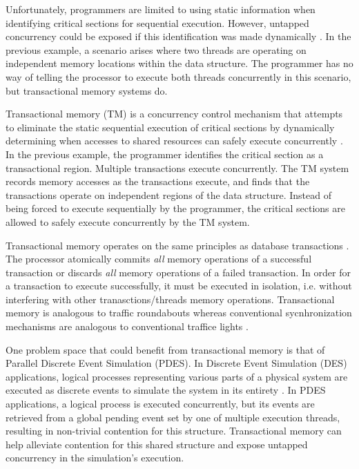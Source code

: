 \documentclass[a4paper]{article}
\begin{document}

\indent Unfortunately, programmers are limited to using static information when
identifying critical sections for sequential execution.  However, untapped
concurrency could be exposed if this identification was made dynamically
\cite{intel_prog_ref}.  In the previous example, a scenario arises where two threads are operating on
independent memory locations within the data structure.  The programmer has no
way of telling the processor to execute both threads concurrently in this
scenario, but transactional memory systems do. \par

\indent Transactional memory (TM) is a concurrency control mechanism that
attempts to eliminate the static sequential execution of critical sections by
dynamically determining when accesses to shared resources can safely execute
concurrently \cite{sle_rajwar}.  In the previous example, the programmer
identifies the critical section as a transactional region. Multiple transactions
execute concurrently.  The TM system records memory accesses as the transactions
execute, and finds that the transactions operate on independent regions of the
data structure.  Instead of being forced to execute sequentially by the
programmer, the critical sections are allowed to safely execute concurrently by
the TM system.\par 

\indent Transactional memory operates on the same principles as database
transactions \cite{tm_2nd}.  The processor atomically commits \textit{all}
memory operations of a successful transaction or discards \textit{all} memory
operations of a failed transaction.  In order for a transaction to execute
successfully, it must be executed in isolation, i.e. without interfering with
other tranasctions/threads memory operations. Transactional memory is analogous
to traffic roundabouts whereas conventional sycnhronization mechanisms are
analogous to conventional traffice lights \cite{neuling_vid}. \par

\indent One problem space that could benefit from transactional memory is that of
Parallel Discrete Event Simulation (PDES).  In Discrete Event Simulation (DES)
applications, logical processes representing various parts of a physical system
are executed as discrete events to simulate the system in its entirety
\cite{fujimoto}.  In PDES applications, a logical process is executed
concurrently, but its events are retrieved from a global pending event set by
one of multiple execution threads, resulting in non-trivial contention for this
structure.  Transactional memory can help alleviate contention for this shared
structure and expose untapped concurrency in the simulation's execution.\par
\end{document}
